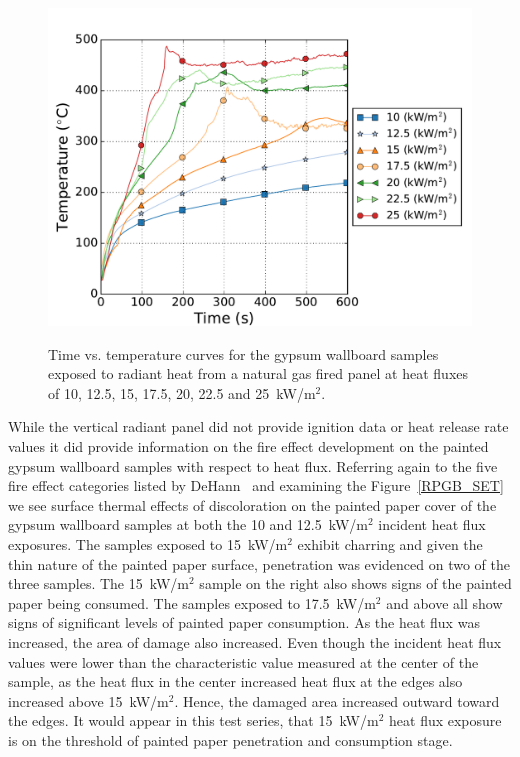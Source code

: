 \documentclass[twoside]{uocthesis}
\begin{document}
{\begin{figure}[p]
	\centering
	\includegraphics[width=\textwidth]{../Figures/RP_GB_Front} \\
	\caption[Time vs. temperature curves for the gypsum wallboard samples exposed to radiant heat from a natural gas fired panel]{Time vs. temperature curves for the gypsum wallboard samples exposed to radiant heat from a natural gas fired panel at heat fluxes of 10, 12.5, 15, 17.5, 20, 22.5 and 25~kW/m$^2$.}
	\label{RP_GB_Front}
\end{figure}

While the vertical radiant panel did not provide ignition data or heat release rate values it did provide information on the fire effect development on the painted gypsum wallboard samples with respect to heat flux.  Referring again to the five fire effect categories listed by DeHann~\cite{DeHaan:2012} and examining the Figure~\ref{RPGB_SET} we see surface thermal effects of discoloration on the painted paper cover of the gypsum wallboard samples at both the 10 and 12.5~kW/m$^2$ incident heat flux exposures.  The samples exposed to 15~kW/m$^2$ exhibit charring and given the thin nature of the painted paper surface, penetration was evidenced on two of the three samples.  The 15~kW/m$^2$ sample on the right also shows signs of the painted paper being consumed.  The samples exposed to 17.5~kW/m$^2$ and above all show signs of significant levels of painted paper consumption.  As the heat flux was increased, the area of damage also increased. Even though the incident heat flux values were lower than the characteristic value measured at the center of the sample, as the heat flux in the center increased heat flux at the edges also increased above 15~kW/m$^2$. Hence, the damaged area increased outward toward the edges. It would appear in this test series, that 15~kW/m$^2$ heat flux exposure is on the threshold of painted paper penetration and consumption stage.            

}
\end{document}
